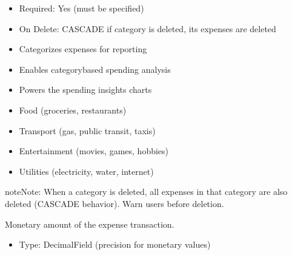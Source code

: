 \documentclass[letterpaper,10pt,english]{sphinxmanual}
\begin{document}
\begin{fulllineitems}
\begin{fulllineitems}
\begin{description}
\begin{itemize}
\item {} 
\sphinxAtStartPar
Required: Yes (must be specified)

\item {} 
\sphinxAtStartPar
On Delete: CASCADE \sphinxhyphen{} if category is deleted, its expenses are deleted

\end{itemize}

\begin{itemize}
\item {} 
\sphinxAtStartPar
Categorizes expenses for reporting

\item {} 
\sphinxAtStartPar
Enables category\sphinxhyphen{}based spending analysis

\item {} 
\sphinxAtStartPar
Powers the spending insights charts

\end{itemize}

\begin{itemize}
\item {} 
\sphinxAtStartPar
Food (groceries, restaurants)

\item {} 
\sphinxAtStartPar
Transport (gas, public transit, taxis)

\item {} 
\sphinxAtStartPar
Entertainment (movies, games, hobbies)

\item {} 
\sphinxAtStartPar
Utilities (electricity, water, internet)

\end{itemize}

\end{description}

\begin{sphinxadmonition}{note}{Note:}
\sphinxAtStartPar
When a category is deleted, all expenses in that category
are also deleted (CASCADE behavior). Warn users before deletion.
\end{sphinxadmonition}

\end{fulllineitems}


\begin{fulllineitems}
\label{\detokenize{expensesApp:id16}}
\pysigstartsignatures
\pysigline
{}
\pysigstopsignatures
\sphinxAtStartPar
Monetary amount of the expense transaction.
\begin{description}
\begin{itemize}
\item {} 
\sphinxAtStartPar
Type: DecimalField (precision for monetary values)


\end{itemize}
\end{description}
\end{fulllineitems}
\end{fulllineitems}
\end{document}
